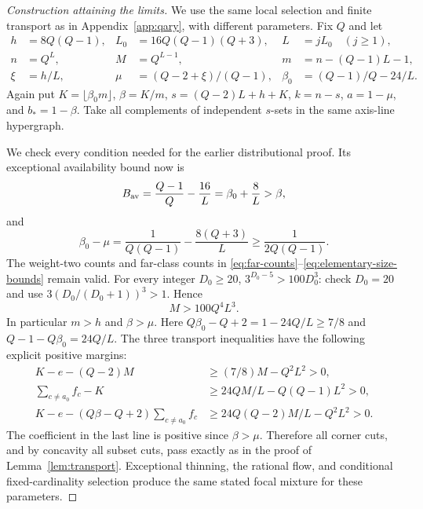 \documentclass[11pt]{article}
\theoremstyle{definition}
\theoremstyle{remark}
\begin{document}
\begin{proof}[Construction attaining the limits]
We use the same local selection and finite transport as in
Appendix~\ref{app:qary}, with different parameters.  Fix $Q$ and let
\begin{align*}
 h&=8Q(Q-1),& L_0&=16Q(Q-1)(Q+3),& L&=jL_0\quad(j\ge1),\\
 n&=Q^L,& M&=Q^{L-1},&m&=n-(Q-1)L-1,\\
 \xi&=h/L,&\mu&=(Q-2+\xi)/(Q-1),&
 \beta_0&=(Q-1)/Q-24/L.
\end{align*}
Again put $K=\lfloor\beta_0m\rfloor$, $\beta=K/m$,
$s=(Q-2)L+h+K$, $k=n-s$, $a=1-\mu$, and $b_*=1-\beta$.
Take all complements of independent $s$-sets in the same axis-line
hypergraph.

We check every condition needed for the earlier distributional proof.
Its exceptional availability bound now is
\[
 B_{\rm av}=\frac{Q-1}{Q}-\frac{16}{L}
            =\beta_0+\frac8L>\beta,
\]
and
\[
 \beta_0-\mu=\frac1{Q(Q-1)}-\frac{8(Q+3)}L
             \ge\frac1{2Q(Q-1)}.
\]
The weight-two counts and far-class counts in
\eqref{eq:far-counts}--\eqref{eq:elementary-size-bounds} remain valid.
For every integer $D_0\ge20$, $3^{D_0-5}>100D_0^3$: check $D_0=20$
and use $3(D_0/(D_0+1))^3>1$.  Hence
\[
 M>100Q^4L^3.
\]
In particular $m>h$ and $\beta>\mu$.
Here $Q\beta_0-Q+2=1-24Q/L\ge7/8$ and
$Q-1-Q\beta_0=24Q/L$.  The three transport inequalities have the
following explicit positive margins:
\begin{align*}
 K-e-(Q-2)M&\ge(7/8)M-Q^2L^2>0,\\
 \sum_{c\ne a_0} f_c-K&\ge24QM/L-Q(Q-1)L^2>0,\\
 K-e-(Q\beta-Q+2)\sum_{c\ne a_0}f_c
       &\ge24Q(Q-2)M/L-Q^2L^2>0.
\end{align*}
The coefficient in the last line is positive since $\beta>\mu$.
Therefore all corner cuts, and by concavity all subset cuts, pass exactly
as in the proof of Lemma~\ref{lem:transport}.  Exceptional thinning,
the rational flow, and conditional fixed-cardinality selection produce
the same stated focal mixture for these parameters.


\end{proof}
\end{document}
